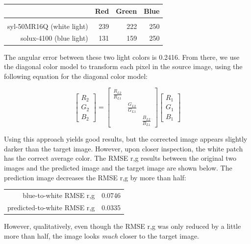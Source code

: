 \documentclass{article}
\begin{document}
\begin{tabular}{r | r r r}
                              & Red & Green & Blue \\
    \hline                                         \\
    syl-50MR16Q (white light) & 239 &   222 &  250 \\
      solux-4100 (blue light) & 131 &   159 &  250
\end{tabular}

The angular error between these two light colors is 0.2416.
From 
there, we use the diagonal color model to transform each pixel in the source 
image, using the following equation for the diagonal color model:

$$
\begin{bmatrix}
R_2 \\
G_2 \\
B_2
\end{bmatrix} = \begin{bmatrix}
\frac{R_{L2}}{R_{L1}} &                       &                       \\
                      & \frac{G_{L2}}{G_{L1}} &                       \\
                      &                       & \frac{B_{L2}}{B_{L1}}
\end{bmatrix} \begin{bmatrix}
R_1 \\
G_1 \\
B_1
\end{bmatrix}
$$

Using 
this approach yields good results, but the corrected image appears slightly 
darker than the target image. However, upon closer inspection, the white patch 
has the correct average color. The RMSE r,g results between the original two 
images and the predicted image and the target image are shown below. The 
prediction image decreases the RMSE r,g by more than half:

\begin{tabular}{r | r}
    blue-to-white RMSE r,g & 0.0746 \\
    predicted-to-white RMSE r,g & 0.0335
\end{tabular}

However, qualitatively, even though the RMSE r,g was only reduced by a little 
more than half, the image looks \textit{much} closer to the target image.
\end{document}
